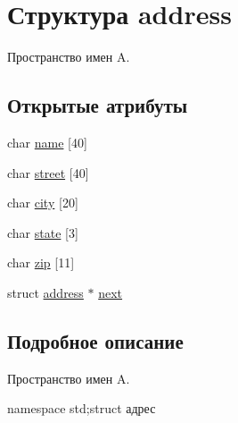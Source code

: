 \hypertarget{structaddress}{\section{Структура address}
\label{structaddress}
}


Пространство имен A.  


\subsection*{Открытые атрибуты}
\begin{DoxyCompactItemize}
\item 
char \hyperlink{structaddress_a6e6c496beec05d918fc03afb8ab140ef}{name} \mbox{[}40\mbox{]}
\item 
char \hyperlink{structaddress_a1b54cdcd27d206d5c0beab8ec87c68ad}{street} \mbox{[}40\mbox{]}
\item 
char \hyperlink{structaddress_a0c78bb35ec35cbad5ce3d6741de018e0}{city} \mbox{[}20\mbox{]}
\item 
char \hyperlink{structaddress_a461a1fbc2cf76f0ad1ff1a9ce56c7f27}{state} \mbox{[}3\mbox{]}
\item 
char \hyperlink{structaddress_aec1400bd12120a14f89c8329737e5779}{zip} \mbox{[}11\mbox{]}
\item 
struct \hyperlink{structaddress}{address} $\ast$ \hyperlink{structaddress_aad59261f2867a30d99b5707b0b0a4ce5}{next}
\end{DoxyCompactItemize}


\subsection{Подробное описание}
Пространство имен A. 

namespace std;struct адрес 

